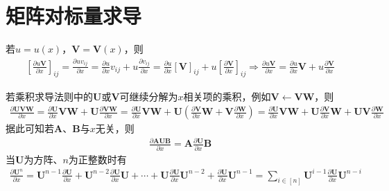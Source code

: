 \documentclass{ctexart}
\theoremstyle{definition}
\def \Av {\mathbf{A}}
\def \Bv {\mathbf{B}}
\def \Uv {\mathbf{U}}
\def \Vv {\mathbf{V}}
\def \Wv {\mathbf{W}}
\begin{document}
\section{矩阵对标量求导}

若$u = u(x)$，$\Vv = \Vv(x)$，则
\begin{align*}
    \left[ \frac{\partial u \Vv}{\partial x} \right]_{ij} = \frac{\partial u v_{ij}}{\partial x} = \frac{\partial u}{\partial x} v_{ij} + u \frac{\partial v_{ij}}{\partial x} = \frac{\partial u}{\partial x} \left[ \Vv \right]_{ij} + u \left[ \frac{\partial \Vv}{\partial x} \right]_{ij} \Longrightarrow \frac{\partial u \Vv}{\partial x} = \frac{\partial u}{\partial x} \Vv + u \frac{\partial \Vv}{\partial x}
\end{align*}

若乘积求导法则中的$\Uv$或$\Vv$可继续分解为$x$相关项的乘积，例如$\Vv \leftarrow \Vv \Wv$，则
\begin{align} \label{eq: product}
    \frac{\partial \Uv \Vv \Wv}{\partial x} = \frac{\partial \Uv}{\partial x} \Vv \Wv + \Uv \frac{\partial \Vv \Wv}{\partial x} = \frac{\partial \Uv}{\partial x} \Vv \Wv + \Uv \left( \frac{\partial \Vv}{\partial x} \Wv + \Vv \frac{\partial \Wv}{\partial x} \right) = \frac{\partial \Uv}{\partial x} \Vv \Wv + \Uv \frac{\partial \Vv}{\partial x} \Wv + \Uv \Vv \frac{\partial \Wv}{\partial x}
\end{align}
据此可知若$\Av$、$\Bv$与$x$无关，则
\begin{align*}
    \frac{\partial \Av \Uv \Bv}{\partial x} = \Av \frac{\partial \Uv}{\partial x} \Bv
\end{align*}
当$\Uv$为方阵、$n$为正整数时有
\begin{align} \label{eq: power}
    \frac{\partial \Uv^n}{\partial x} = \Uv^{n-1} \frac{\partial \Uv}{\partial x} + \Uv^{n-2} \frac{\partial \Uv}{\partial x} \Uv + \cdots + \Uv \frac{\partial \Uv}{\partial x} \Uv^{n-2} + \frac{\partial \Uv}{\partial x} \Uv^{n-1} = \sum_{i \in [n]} \Uv^{i-1} \frac{\partial \Uv}{\partial x} \Uv^{n-i}
\end{align}
\end{document}
